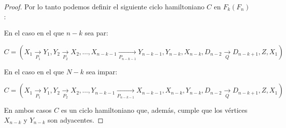 \begin{proof}
            Por lo tanto podemos definir el siguiente ciclo hamiltoniano $C$ en
            $F_k(F_n)$: 
    
            En el caso en el que $n-k$ sea par:
            
            $C =(X_1 \xrightarrow[P_1]{} Y_1, Y_2 \xrightarrow[P_2]{} X_2,
            \dots, X_{n-k-1} \xrightarrow[P_{n-k-1}]{} Y_{n-k-1}, Y_{n-k},
            X_{n-k}, D_{n-2} \xrightarrow[Q]{} D_{n-k+1}, Z, X_1)$
    
            En el caso en el que $N-k$ sea impar:
    
            $C = (X_1 \xrightarrow[P_1]{} Y_1, Y_2 \xrightarrow[P_2]{} X_2,
            \dots, Y_{n-k-1} \xrightarrow[P_{n-k-1}]{} X_{n-k-1}, X_{n-k},
            Y_{n-k}, D_{n-2} \xrightarrow[Q]{} D_{n-k+1}, Z, X_1)$
    
            En ambos casos $C$ es un ciclo hamiltoniano que, adem\'as, cumple
            que los v\'ertices $X_{n-k}$ y $Y_{n-k}$ son adyacentes. 
    
        \end{proof}